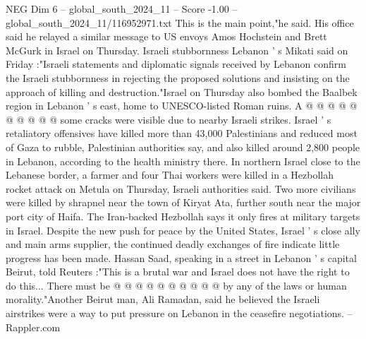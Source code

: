 \begin{textsample}{NEG Dim 6 – global\_south\_2024\_11 – Score -1.00 – global\_south\_2024\_11/116952971.txt}
This is the main point,"he said.
His office said he relayed a similar message to US envoys Amos Hochstein and Brett McGurk in Israel on Thursday.
Israeli stubbornness Lebanon ' s Mikati said on Friday :"Israeli statements and diplomatic signals received by Lebanon confirm the Israeli stubbornness in rejecting the proposed solutions and insisting on the approach of killing and destruction."Israel on Thursday also bombed the Baalbek region in Lebanon ' s east, home to UNESCO-listed Roman ruins.
A @ @ @ @ @ @ @ @ @ @ some cracks were visible due to nearby Israeli strikes.
Israel ' s retaliatory offensives have killed more than 43,000 Palestinians and reduced most of Gaza to rubble, Palestinian authorities say, and also killed around 2,800 people in Lebanon, according to the health ministry there.
In northern Israel close to the Lebanese border, a farmer and four Thai workers were killed in a Hezbollah rocket attack on Metula on Thursday, Israeli authorities said.
Two more civilians were killed by shrapnel near the town of Kiryat Ata, further south near the major port city of Haifa.
The Iran-backed Hezbollah says it only fires at military targets in Israel.
Despite the new push for peace by the United States, Israel ' s close ally and main arms supplier, the continued deadly exchanges of fire indicate little progress has been made.
Hassan Saad, speaking in a street in Lebanon ' s capital Beirut, told Reuters :"This is a brutal war and Israel does not have the right to do this...
There must be @ @ @ @ @ @ @ @ @ @ by any of the laws or human morality."Another Beirut man, Ali Ramadan, said he believed the Israeli airstrikes were a way to put pressure on Lebanon in the ceasefire negotiations. -- Rappler.com

\end{textsample}
